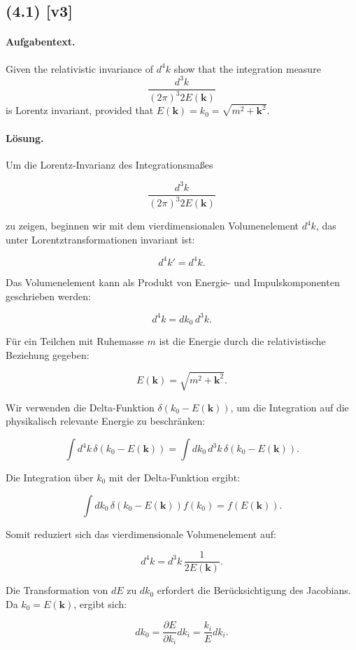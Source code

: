 \documentclass[11pt,a4paper]{article}
\begin{document}
\subsection*{(4.1) [v3]}
\paragraph{Aufgabentext.}
Given the relativistic invariance of $d^4 k$ show that the integration measure
$$
\frac{d^3 k}{(2 \pi)^3 2 E(\mathbf{k})}
$$
is Lorentz invariant, provided that $E(\mathbf{k})=k_0=\sqrt{m^2+\mathbf{k}^2}$.

\paragraph{Lösung.}
Um die Lorentz-Invarianz des Integrationsmaßes 

\[
\frac{d^3 k}{(2 \pi)^3 2 E(\mathbf{k})}
\]

zu zeigen, beginnen wir mit dem vierdimensionalen Volumenelement \(d^4 k\), das unter Lorentztransformationen invariant ist:

\[
d^4 k' = d^4 k.
\]

Das Volumenelement kann als Produkt von Energie- und Impulskomponenten geschrieben werden:

\[
d^4 k = dk_0 \, d^3 k.
\]

Für ein Teilchen mit Ruhemasse \(m\) ist die Energie durch die relativistische Beziehung gegeben:

\[
E(\mathbf{k}) = \sqrt{m^2 + \mathbf{k}^2}.
\]

Wir verwenden die Delta-Funktion \(\delta(k_0 - E(\mathbf{k}))\), um die Integration auf die physikalisch relevante Energie zu beschränken:

\[
\int d^4 k \, \delta(k_0 - E(\mathbf{k})) = \int dk_0 \, d^3 k \, \delta(k_0 - E(\mathbf{k})).
\]

Die Integration über \(k_0\) mit der Delta-Funktion ergibt:

\[
\int dk_0 \, \delta(k_0 - E(\mathbf{k})) f(k_0) = f(E(\mathbf{k})).
\]

Somit reduziert sich das vierdimensionale Volumenelement auf:

\[
d^4 k = d^3 k \, \frac{1}{2 E(\mathbf{k})}.
\]

Die Transformation von \(dE\) zu \(dk_0\) erfordert die Berücksichtigung des Jacobians. Da \(k_0 = E(\mathbf{k})\), ergibt sich:

\[
dk_0 = \frac{\partial E}{\partial k_i} dk_i = \frac{k_i}{E} dk_i.
\]
\end{document}
